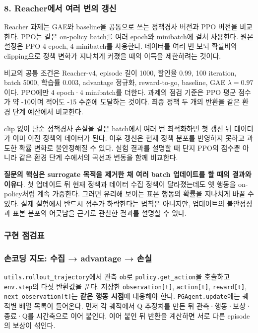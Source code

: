\documentclass[11pt,a4paper]{article}
\begin{document}
\subsubsection{8. Reacher에서 여러 번의 갱신}

Reacher 과제는 GAE와 baseline을 공통으로 쓰는 정책경사 버전과 PPO 버전을 비교한다. PPO는 같은 on-policy batch를 여러 epoch와 minibatch에 걸쳐 사용한다. 원본 설정은 PPO 4 epoch, 4 minibatch를 사용한다. 데이터를 여러 번 보되 확률비와 clipping으로 정책 변화가 지나치게 커졌을 때의 이득을 제한하려는 것이다.\par

비교의 공통 조건은 Reacher-v4, episode 길이 1000, 할인율 0.99, 100 iteration, batch 5000, 학습률 0.003, advantage 정규화, reward-to-go, baseline, GAE $\lambda=0.97$이다. PPO에만 4 epoch·4 minibatch를 더한다. 과제의 점검 기준은 PPO 평균 점수가 약 -10이며 적어도 -15 수준에 도달하는 것이다. 최종 정책 두 개의 반환을 같은 환경 단계 예산에서 비교한다.\par

clip 없이 단순 정책경사 손실을 같은 batch에서 여러 번 최적화하면 첫 갱신 뒤 데이터가 이미 이전 정책의 데이터가 된다. 이후 갱신은 현재 정책 분포를 반영하지 못하고 과도한 확률 변화로 불안정해질 수 있다. 실험 결과를 설명할 때 단지 PPO의 점수뿐 아니라 같은 환경 단계 수에서의 곡선과 변동을 함께 비교한다.\par

\textbf{질문의 핵심은 surrogate 목적을 제거한 채 여러 batch 업데이트를 할 때의 결과와 이유}다. 첫 업데이트 뒤 현재 정책과 데이터 수집 정책이 달라졌는데도 옛 행동을 on-policy처럼 계속 가중한다. 그러면 유리해 보이는 표본 행동의 확률을 지나치게 바꿀 수 있다. 실제 실험에서 반드시 점수가 하락한다는 법칙은 아니지만, 업데이트의 불안정성과 표본 분포의 어긋남을 근거로 관찰한 결과를 설명할 수 있다.\par

\subsubsection{구현 점검표}

\subsubsection{손코딩 지도: 수집 → advantage → 손실}

\texttt{utils.\allowbreak{}rollout\_\allowbreak{}trajectory}에서 관측 \texttt{ob}로 \texttt{policy.\allowbreak{}get\_\allowbreak{}action}을 호출하고 \texttt{env.\allowbreak{}step}의 다섯 반환값을 푼다. 저장한 \texttt{observation[t]}, \texttt{action[t]}, \texttt{reward[t]}, \texttt{next\_\allowbreak{}observation[t]}는 \textbf{같은 행동 시점}에 대응해야 한다. \texttt{PGAgent.\allowbreak{}update}에는 궤적별 배열 목록이 들어온다. 먼저 각 궤적에서 Q 추정치를 만든 뒤 관측·행동·보상·종료·Q를 시간축으로 이어 붙인다. 이어 붙인 뒤 반환을 계산하면 서로 다른 episode의 보상이 섞인다.\par
\end{document}
